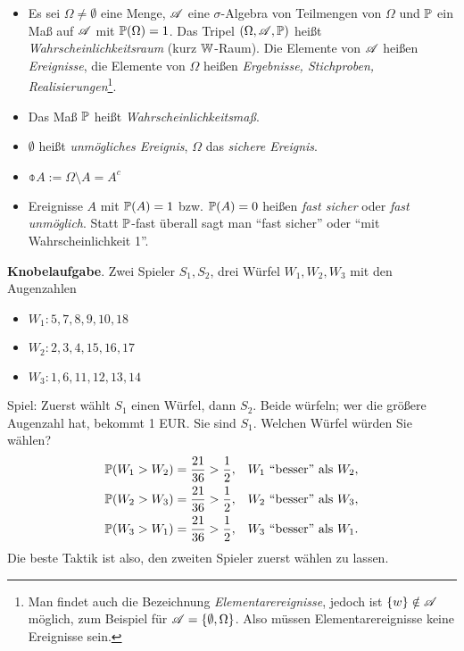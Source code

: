 \begin{defn}
  \begin{itemize}
  \item Es sei $\Omega \ne \emptyset$ eine Menge, $\mathscr{A}$ eine $\sigma$-Algebra von
  Teilmengen von $\Omega$ und $\mathbb{P}$ ein Maß auf $\mathscr{A}$ mit $\mathbb{P}(\Omega) = 1$. Das
  Tripel $(\Omega, \mathscr{A}, \mathbb{P})$ heißt \emph{Wahrscheinlichkeitsraum} (kurz
  $\mathbb{W}$-Raum). Die Elemente von $\mathscr{A}$ heißen \emph{Ereignisse}, die Elemente von
  $\Omega$ heißen \emph{Ergebnisse, Stichproben, Realisierungen}\footnote{%
    Man findet auch  die Bezeichnung \emph{Elementarereignisse}, jedoch ist $\{w\}
    \notin \mathscr{A}$ möglich, zum Beispiel für $\mathscr{A} = \{ \emptyset, \Omega \}$. Also
    müssen Elementarereignisse keine Ereignisse sein.}.
  \item Das Maß $\mathbb{P}$ heißt \emph{Wahrscheinlichkeitsmaß}.
  \item $\emptyset$ heißt \emph{unmögliches Ereignis}, $\Omega$ das \emph{sichere Ereignis}.
  \item $\obar{A} := \Omega \setminus A = A^c$
  \item Ereignisse $A$ mit $\mathbb{P}(A) = 1$ bzw. $\mathbb{P}(A) = 0$ heißen \emph{fast
      sicher} oder \emph{fast unmöglich}. Statt $\mathbb{P}$-fast überall sagt man ``fast
    sicher'' oder ``mit Wahrscheinlichkeit 1''.
  \end{itemize}
\end{defn}

\textbf{Knobelaufgabe}.
Zwei Spieler $S_1, S_2$, drei Würfel $W_1, W_2, W_3$ mit den Augenzahlen
\begin{itemize}
\item $W_1: 5, 7, 8, 9, 10, 18$
\item $W_2: 2, 3, 4, 15, 16, 17$
\item $W_3: 1, 6, 11, 12, 13, 14$
\end{itemize}
Spiel: Zuerst wählt $S_1$ einen Würfel, dann $S_2$. Beide würfeln; wer die
größere Augenzahl hat, bekommt 1 EUR. Sie sind $S_1$. Welchen Würfel würden Sie
wählen?
\begin{align*}
  \mathbb{P}( W_1 > W_2 ) &= \frac{21}{36} > \frac{1}{2}, & W_1 \text{ ``besser'' als } W_2, \\
  \mathbb{P}( W_2 > W_3 ) &= \frac{21}{36} > \frac{1}{2}, & W_2 \text{ ``besser'' als } W_3, \\
  \mathbb{P}( W_3 > W_1 ) &= \frac{21}{36} > \frac{1}{2}, & W_3 \text{ ``besser'' als } W_1.
\end{align*}
Die beste Taktik ist also, den zweiten Spieler zuerst wählen zu lassen.

